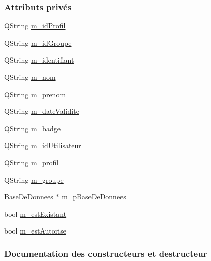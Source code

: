 \subsubsection*{Attributs privés}
\begin{DoxyCompactItemize}
\item 
Q\+String \hyperlink{class_utilisateur_terminal_af3d06352ecbd2d4439626b4ba53b55be}{m\+\_\+id\+Profil}
\item 
Q\+String \hyperlink{class_utilisateur_terminal_a669ece5480e25b47711c430d020581c2}{m\+\_\+id\+Groupe}
\item 
Q\+String \hyperlink{class_utilisateur_terminal_a4dd1abd0c87ed9bf99ab3343e17cef43}{m\+\_\+identifiant}
\item 
Q\+String \hyperlink{class_utilisateur_terminal_a4b48835dcadacd5e7d5c9662b70cdc7d}{m\+\_\+nom}
\item 
Q\+String \hyperlink{class_utilisateur_terminal_a6dc3be09e844fc14aafec8019a1e2a5e}{m\+\_\+prenom}
\item 
Q\+String \hyperlink{class_utilisateur_terminal_a7af3e6861711071624b93544adf3ca48}{m\+\_\+date\+Validite}
\item 
Q\+String \hyperlink{class_utilisateur_terminal_a06e0603919eb3846cf5bd232c105d1a7}{m\+\_\+badge}
\item 
Q\+String \hyperlink{class_utilisateur_terminal_a3a8aeb429529ae1600c799e427370f78}{m\+\_\+id\+Utilisateur}
\item 
Q\+String \hyperlink{class_utilisateur_terminal_ac25eb049eaa55bc16d2f516a551eb769}{m\+\_\+profil}
\item 
Q\+String \hyperlink{class_utilisateur_terminal_a824944eb7dc8689a0b0ecfa2fc9e4e6c}{m\+\_\+groupe}
\item 
\hyperlink{class_base_de_donnees}{Base\+De\+Donnees} $\ast$ \hyperlink{class_utilisateur_terminal_a93aefda4243fed6c1b74d78fa5fc954d}{m\+\_\+p\+Base\+De\+Donnees}
\item 
bool \hyperlink{class_utilisateur_terminal_a6b16983fcb2b0f1f698f595309a67828}{m\+\_\+est\+Existant}
\item 
bool \hyperlink{class_utilisateur_terminal_a79d15bdf8428eb1a131ce4801ac619aa}{m\+\_\+est\+Autorise}
\end{DoxyCompactItemize}


\subsubsection{Documentation des constructeurs et destructeur}
\mbox{\label{class_utilisateur_terminal_a3a4e47b0f67f67f2396671941688d036}} 
